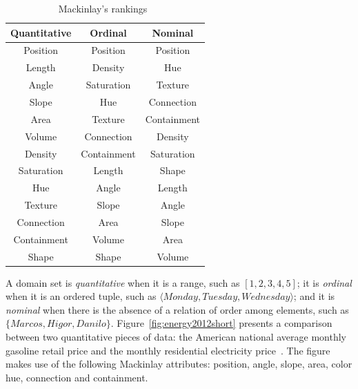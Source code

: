 \begin{table}[!ht]
    \centering
    \caption{Mackinlay's rankings~\cite{mackinlay1986automating}}
    \begin{tabular}{ c c c }
    \textbf{Quantitative} & \textbf{Ordinal} & \textbf{Nominal} \\
    \hline\hline
    Position     & Position    & Position    \\
    Length       & Density     & Hue         \\
    Angle        & Saturation  & Texture     \\
    Slope        & Hue         & Connection  \\
    Area         & Texture     & Containment \\
    Volume       & Connection  & Density     \\
    Density      & Containment & Saturation  \\
    Saturation   & Length      & Shape       \\
    Hue          & Angle       & Length      \\
    Texture      & Slope       & Angle       \\
    Connection   & Area        & Slope       \\
    Containment  & Volume      & Area        \\
    Shape        & Shape       & Volume      \\
    \hline
    \end{tabular}
\label{tab:mackinlay}
\end{table}

A domain set is \textit{quantitative} when it is a range, such as $[1,2,3,4,5]$;
it is \textit{ordinal} when it is an ordered tuple, such as $\langle{}Monday,
Tuesday, Wednesday\rangle{}$; and it is \textit{nominal} when there is the
absence of a relation of order among elements, such as\newline
$\{Marcos, Higor, Danilo\}$.
Figure~\ref{fig:energy2012short} presents a comparison between two quantitative
pieces of data: the American national average monthly gasoline retail price and
the monthly residential electricity price~\cite{energy2012short}. The figure
makes use of the following Mackinlay attributes: position, angle, slope, area,
color hue, connection and containment.

